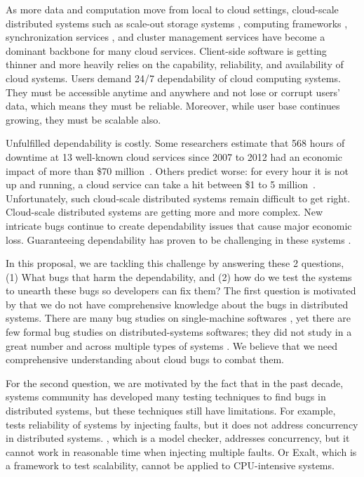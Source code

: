 As more data and computation move from local to cloud settings, cloud-scale
distributed systems such as scale-out storage systems \cite{Chang+06-BigTable,
DeCandia+07-Dynamo, Ghemawat+03-GoogleFS, Nightingale+12-FlatFDS}, computing
frameworks \cite{DeanGhemawat04-MapReduce, Murray+13-NaiadTimelyDataflow},
synchronization services \cite{Burrows06-Chubby, Hunt+10-ZooKeeperPaper}, and
cluster management services \cite{Hindman+11-Mesos, Kumar+13-Yarn} have become a
dominant backbone for many cloud services. Client-side software is getting
thinner and more heavily relies on the capability, reliability, and availability
of cloud systems. Users demand 24/7 dependability of cloud computing systems.
They must be accessible anytime and anywhere and not lose or corrupt users'
data, which means they must be reliable. Moreover, while user base continues
growing, they must be scalable also.

Unfulfilled dependability is costly. Some researchers estimate that 568 hours of
downtime at 13 well-known cloud services since 2007 to 2012 had an economic
impact of more than \$70 million~\cite{Essers12-70Million}. Others predict
worse: for every hour it is not up and running, a cloud service can take a hit
between \$1 to 5 million~\cite{Linthicum13-InfoworldCostOutages}.
Unfortunately, such cloud-scale distributed systems remain difficult to get
right. 
%
Cloud-scale distributed systems are getting more and more complex. New intricate
bugs continue to create dependability issues that cause major economic loss.
Guaranteeing dependability has proven to be challenging in these systems
\cite{Gunawi+11-FateDestini, Guo+11-Demeter, Wang+14-Exalt, Yang+09-Modist}.

In this proposal, we are tackling this challenge by answering these 2 questions,
(1) What bugs that harm the dependability, and (2) how do we test the systems to
unearth these bugs so developers can fix them? The first question is motivated
by that we do not have comprehensive knowledge about the bugs in distributed
systems. There are many bug studies on single-machine softwares
\cite{Jin+12-PerformanceBugs, Lu+08-ConcurrencyBugStudy, Palix+11-FaultsInLinux,
Sahoo+10-StudyBugsServerSoftware}, yet there are few formal bug studies on
distributed-systems softwares; they did not study in a great number and across
multiple types of systems \cite{Li+13-ScopeBugStudy, Xiao+14-NonDetMR}. We
believe that we need comprehensive understanding about cloud bugs to combat
them.

For the second question, we are motivated by the fact that in the past decade,
systems community has developed many testing techniques
\cite{Gunawi+11-FateDestini, Guo+11-Demeter, Wang+14-Exalt, Yang+09-Modist} to
find bugs in distributed systems, but these techniques still have limitations.
For example, \fate\ \cite{Gunawi+11-FateDestini} tests reliability of systems by
injecting faults, but it does not address concurrency in distributed systems.
\modist, which is a model checker, addresses concurrency, but it cannot work in
reasonable time when injecting multiple faults. Or Exalt, which is a framework
to test scalability, cannot be applied to CPU-intensive systems. 

